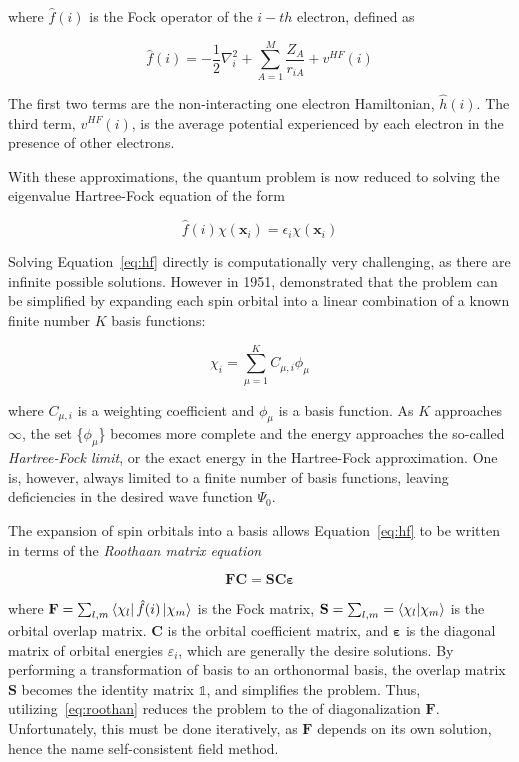\begin{doublespace}
\noindent where $\hat{f}(i)$ is the Fock operator of the $i-th$ electron,
defined as

\begin{equation}
  \hat{f}(i) = -\frac{1}{2}\nabla^2_i + \sum_{A=1}^M\frac{Z_A}{r_{iA}} + v^{HF}(i)
\end{equation}

\noindent The first two terms are the non-interacting one electron Hamiltonian,
$\hat{h}(i)$. The third term, $v^{HF}(i)$, is the average potential experienced
by each electron in the presence of other electrons.

With these approximations, the quantum problem is now reduced to solving the
eigenvalue Hartree-Fock equation of the form

\begin{equation}
\hat{f}(i)\chi(\mathbf{x}_i) = \epsilon_i\chi(\mathbf{x}_i)
\label{eq:hf}
\end{equation}

Solving Equation~\ref{eq:hf} directly is computationally very challenging, as
there are infinite possible solutions.  However in 1951, \citet{Roothaan1951}
demonstrated that the problem can be simplified by expanding each spin orbital
into a linear combination of a known finite number $K$ basis functions:

\begin{equation}
\chi_i = \sum_{\mu=1}^K C_{\mu,i}\phi_{\mu}
\end{equation}

\noindent where $C_{\mu,i}$ is a weighting coefficient and $\phi_{\mu}$ is a
basis function. As $K$ approaches $\infty$, the set \{$\phi_{\mu}$\} becomes
more complete and the energy approaches the so-called \emph{Hartree-Fock
limit}, or the exact energy in the Hartree-Fock approximation. One is, however,
always limited to a finite number of basis functions, leaving deficiencies in
the desired wave function $\Psi_0$.

The expansion of spin orbitals into a basis allows Equation~\ref{eq:hf} to be
written in terms of the \emph{Roothaan matrix equation}

\begin{equation}
\mathbf{F}\mathbf{C} = \mathbf{S}\mathbf{C}\mathbf{\varepsilon}
\label{eq:roothan}
\end{equation}

\noindent where $\mathbf{F} = \sum_{l,m} \bra{\chi_l} \hat{f}(i) \ket{\chi_m}$
is the Fock matrix, $\mathbf{S} = \sum_{l,m} = \bra{\chi_l}\ket{\chi_m}$ is the
orbital overlap matrix. $\mathbf{C}$ is the orbital coefficient matrix, and
$\mathbf{\varepsilon}$ is the diagonal matrix of orbital energies
$\varepsilon_i$, which are generally the desire solutions. By performing a
transformation of basis to an orthonormal basis, the overlap matrix
$\mathbf{S}$ becomes the identity matrix $\mathbb{1}$, and simplifies the
problem. Thus, utilizing~\ref{eq:roothan} reduces the problem to the of
diagonalization $\mathbf{F}$. Unfortunately, this must be done iteratively, as
$\mathbf{F}$ depends on its own solution, hence the name self-consistent field
method.


\end{doublespace}
